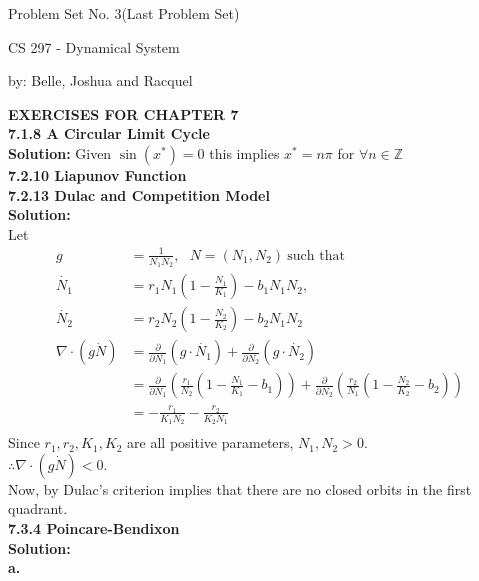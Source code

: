 \documentclass[12pt]{article}
\newcommand{\mycbox}[1]{\tikz{\path[draw=#1,fill=#1] (0,0) rectangle (.2cm,.2cm);}}
\newtheorem{theorem}{THEOREM}
\begin{document}
\centerline{{\sc Problem Set No. 3(Last Problem Set)}}
\bigskip
\centerline{CS 297 - Dynamical System}
\centerline{by: Belle, Joshua and Racquel}

\bigskip\noindent
{\bf EXERCISES FOR CHAPTER 7 }\\
{\bf 7.1.8 A Circular Limit Cycle} \\
{\bf Solution:} Given $\sin(x^{*}) = 0$ this implies $x^{*} = n\pi$ for $\forall n\in \mathbb{Z}$\\
{\bf 7.2.10 Liapunov Function} \\
{\bf 7.2.13 Dulac and Competition Model}\\
{\bf Solution:} \\
Let 
\begin{align*}
g &=\frac{1}{N_1 N_2},~~~ N=(N_1, N_2)~\text{such that}~\\ \dot{N_1} &=r_1 N_1(1-\frac{N_1}{K_1})-b_1N_1N_2,\\
\dot{N_2} &=r_2 N_2(1-\frac{N_2}{K_2})-b_2N_1N_2\\
\nabla \cdot \left(g \dot{N}\right)&=\frac{\partial}{\partial N_1}\left(g \cdot \dot{N_1}\right)+\frac{\partial}{\partial N_2}\left(g \cdot \dot{N_2}\right)\\
&=\frac{\partial}{\partial N_1}\left(\frac{r_1}{N_2}\left(1-\frac{N_1}{K_1}-b_1\right)\right)+\frac{\partial}{\partial N_2}\left(\frac{r_2}{N_1}\left(1-\frac{N_2}{K_2}-b_2\right)\right)\\
&=-\frac{r_1}{K_1 N_2}-\frac{r_2}{K_2 N_1}\\
\end{align*}
Since $r_1,r_2, K_1,K_2$ are all positive parameters, $N_1, N_2 >0.$\\
$\therefore \nabla \cdot \left(g \dot{N} \right)<0.$\\
Now, by Dulac's criterion implies that there are no closed orbits in the first quadrant. \mycbox{black}\\
{\bf 7.3.4 Poincare-Bendixon}\\
{\bf Solution:}\\
\indent
{\bf a. } 
\end{document}
